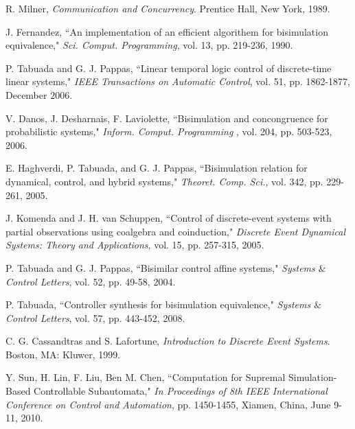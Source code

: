 \documentclass[12pt,draftcls,onecolumn]{IEEEtran}
\begin{document}
\begin{thebibliography}{99}











R. Milner, {\it Communication and Concurrency}. Prentice Hall, New
York, 1989.



J. Fernandez, ``An implementation
of an efficient algorithem for bisimulation equivalence," {\it Sci.
Comput. Programming}, vol. 13, pp. 219-236, 1990.

P. Tabuada and G. J. Pappas, ``Linear temporal logic control of discrete-time linear
systems," {\it IEEE Transactions on Automatic Control}, vol. 51, pp.
1862-1877, December 2006.


V. Danos, J. Desharnais, F. Laviolette, ``Bisimulation and concongruence for probabilistic
systems," {\it Inform. Comput. Programming }, vol. 204, pp. 503-523,
2006.

E. Haghverdi, P. Tabuada, and G. J. Pappas, ``Bisimulation relation for dynamical, control, and hybrid
systems," {\it Theoret. Comp. Sci.}, vol. 342, pp. 229-261, 2005.

J. Komenda and J. H. van Schuppen, ``Control of discrete-event systems with partial observations using coalgebra and
coinduction," {\it Discrete Event Dynamical Systems: Theory and
Applications}, vol. 15, pp. 257-315, 2005.




P. Tabuada and G. J. Pappas, ``Bisimilar control affine
systems," {\it Systems $\&$ Control Letters},  vol. 52, pp. 49-58,
2004.

P. Tabuada, ``Controller synthesis for bisimulation
equivalence," {\it Systems $\&$ Control Letters}, vol. 57, pp.
443-452, 2008.






C. G. Cassandtras and S. Lafortune, {\it Introduction to
Discrete Event Systems}. Boston, MA: Kluwer, 1999.

Y. Sun, H. Lin, F. Liu, Ben M. Chen,
``Computation for Supremal Simulation-Based Controllable
Subautomata," {\it In Proceedings of 8th IEEE International
Conference on Control and Automation}, pp. 1450-1455, Xiamen,
China, June 9-11, 2010.



\end{thebibliography}
\end{document}
